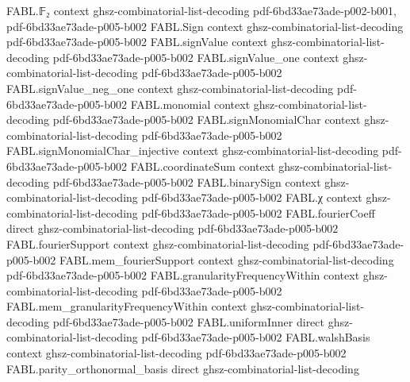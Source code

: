 \begin{theorem}
\label{FABL.fourierCoeff_binaryFunctionOnSignCube}
\leanok
{}
\proofstep
  {FABL.𝔽₂}
  {context}
  {ghsz-combinatorial-list-decoding}
  {pdf-6bd33ae73ade-p002-b001,
    pdf-6bd33ae73ade-p005-b002}
\proofstep
  {FABL.Sign}
  {context}
  {ghsz-combinatorial-list-decoding}
  {pdf-6bd33ae73ade-p005-b002}
\proofstep
  {FABL.signValue}
  {context}
  {ghsz-combinatorial-list-decoding}
  {pdf-6bd33ae73ade-p005-b002}
\proofstep
  {FABL.signValue_one}
  {context}
  {ghsz-combinatorial-list-decoding}
  {pdf-6bd33ae73ade-p005-b002}
\proofstep
  {FABL.signValue_neg_one}
  {context}
  {ghsz-combinatorial-list-decoding}
  {pdf-6bd33ae73ade-p005-b002}
\proofstep
  {FABL.monomial}
  {context}
  {ghsz-combinatorial-list-decoding}
  {pdf-6bd33ae73ade-p005-b002}
\proofstep
  {FABL.signMonomialChar}
  {context}
  {ghsz-combinatorial-list-decoding}
  {pdf-6bd33ae73ade-p005-b002}
\proofstep
  {FABL.signMonomialChar_injective}
  {context}
  {ghsz-combinatorial-list-decoding}
  {pdf-6bd33ae73ade-p005-b002}
\proofstep
  {FABL.coordinateSum}
  {context}
  {ghsz-combinatorial-list-decoding}
  {pdf-6bd33ae73ade-p005-b002}
\proofstep
  {FABL.binarySign}
  {context}
  {ghsz-combinatorial-list-decoding}
  {pdf-6bd33ae73ade-p005-b002}
\proofstep
  {FABL.χ}
  {context}
  {ghsz-combinatorial-list-decoding}
  {pdf-6bd33ae73ade-p005-b002}
\proofstep
  {FABL.fourierCoeff}
  {direct}
  {ghsz-combinatorial-list-decoding}
  {pdf-6bd33ae73ade-p005-b002}
\proofstep
  {FABL.fourierSupport}
  {context}
  {ghsz-combinatorial-list-decoding}
  {pdf-6bd33ae73ade-p005-b002}
\proofstep
  {FABL.mem_fourierSupport}
  {context}
  {ghsz-combinatorial-list-decoding}
  {pdf-6bd33ae73ade-p005-b002}
\proofstep
  {FABL.granularityFrequencyWithin}
  {context}
  {ghsz-combinatorial-list-decoding}
  {pdf-6bd33ae73ade-p005-b002}
\proofstep
  {FABL.mem_granularityFrequencyWithin}
  {context}
  {ghsz-combinatorial-list-decoding}
  {pdf-6bd33ae73ade-p005-b002}
\proofstep
  {FABL.uniformInner}
  {direct}
  {ghsz-combinatorial-list-decoding}
  {pdf-6bd33ae73ade-p005-b002}
\proofstep
  {FABL.walshBasis}
  {context}
  {ghsz-combinatorial-list-decoding}
  {pdf-6bd33ae73ade-p005-b002}
\proofstep
  {FABL.parity_orthonormal_basis}
  {direct}
  {ghsz-combinatorial-list-decoding}

\end{theorem}
